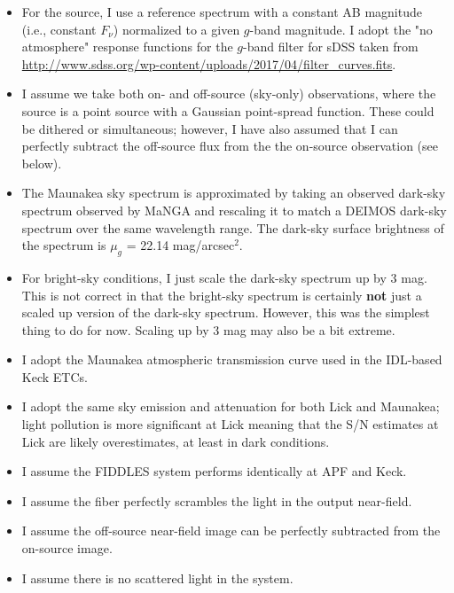 \documentclass[onecolumn,floatfix,tighten]{aastex62}
\begin{document}
\begin{itemize}

\item For the source, I use a reference spectrum with a constant AB
magnitude (i.e., constant $F_\nu$) normalized to a given $g$-band
magnitude. I adopt the "no atmosphere" response functions for the
$g$-band filter for sDSS taken from
\url{http://www.sdss.org/wp-content/uploads/2017/04/filter_curves.fits}.

\item I assume we take both on- and off-source (sky-only)
observations, where the source is a point source with a Gaussian
point-spread function. These could be dithered or simultaneous;
however, I have also assumed that I can perfectly subtract the
off-source flux from the the on-source observation (see below).

\item The Maunakea sky spectrum is approximated by taking an observed
dark-sky spectrum observed by MaNGA and rescaling it to match a
DEIMOS dark-sky spectrum over the same wavelength range. The dark-sky
surface brightness of the spectrum is $\mu_g$ = 22.14 mag/arcsec$^2$.

\item For bright-sky conditions, I just scale the dark-sky spectrum
up by 3 mag. This is not correct in that the bright-sky spectrum is
certainly {\bf not} just a scaled up version of the dark-sky
spectrum. However, this was the simplest thing to do for now. Scaling
up by 3 mag may also be a bit extreme.

\item I adopt the Maunakea atmospheric transmission curve used in the
IDL-based Keck ETCs.

\item I adopt the same sky emission and attenuation for both Lick and
Maunakea; light pollution is more significant at Lick meaning that
the S/N estimates at Lick are likely overestimates, at least in dark
conditions.

\item I assume the FIDDLES system performs identically at APF and
Keck.

\item I assume the fiber perfectly scrambles the light in the output
near-field.

\item I assume the off-source near-field image can be perfectly
subtracted from the on-source image.

\item I assume there is no scattered light in the system.


\end{itemize}
\end{document}
